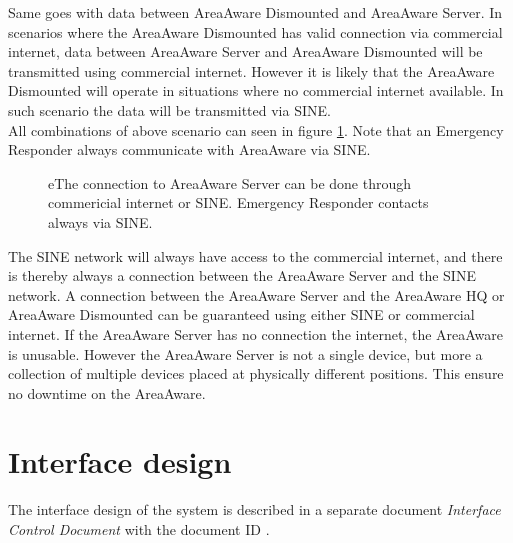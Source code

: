 
\noindent Same goes with data between AreaAware Dismounted and AreaAware Server.
In scenarios where the AreaAware Dismounted has valid connection via commercial internet, data between AreaAware Server and AreaAware Dismounted will be transmitted using commercial internet.
However it is likely that the AreaAware Dismounted will operate in situations where no commercial internet available.
In such scenario the data will be transmitted via SINE.\\

\noindent All combinations of above scenario can seen in figure \ref{fig:ce}.
Note that an Emergency Responder always communicate with AreaAware via SINE.

    \begin{figure}[ht]
        \centering
        \quad\quad
        \quad\quad
        \caption{eThe connection to AreaAware Server can be done through commericial internet or SINE. Emergency Responder contacts always via SINE.}
        \label{fig:ce}
    \end{figure}

The SINE network will always have access to the commercial internet, and there is thereby always a connection between the AreaAware Server and the SINE network.
A connection between the AreaAware Server and the AreaAware HQ or AreaAware Dismounted can be guaranteed using either SINE or commercial internet.
If the AreaAware Server has no connection the internet, the AreaAware is unusable.
However the AreaAware Server is not a single device, but more a collection of multiple devices placed at physically different positions.
This ensure no downtime on the AreaAware.


\section{Interface design}
\label{sec:arch_interface}
The interface design of the system is described in a separate document \emph{Interface Control Document} with the document ID \icd.
